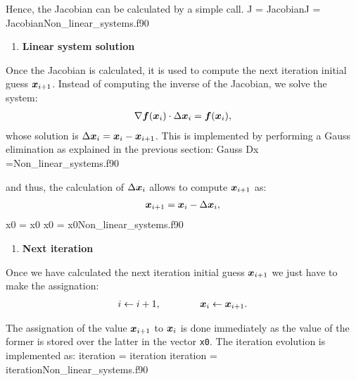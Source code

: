       Hence, the Jacobian can be calculated by a simple call.
      \vspace{0.5cm} 
      {J = Jacobian}{J = Jacobian}{Non_linear_systems.f90}
      
      \begin{enumerate}[resume]
      	\item \textbf{Linear system solution}
      \end{enumerate}
      Once the Jacobian is calculated, it is used to compute the next iteration initial guess $\boldsymbol{x}_{i+1}$. Instead of computing the inverse of the Jacobian, we solve the system:
      \begin{align}
      	\nabla\boldsymbol{f}(\boldsymbol{x}_i)\cdot\Delta \boldsymbol{x}_i
      	=
      	\boldsymbol{f}(\boldsymbol{x}_i) ,
      \end{align}
      whose solution is $\Delta \boldsymbol{x}_i=\boldsymbol{x}_i-\boldsymbol{x}_{i+1}$. 
      This is implemented by performing a Gauss elimination as explained in the previous section:
      \vspace{0.5cm} 
      {Gauss}
      {Dx =}{Non_linear_systems.f90}
      
      
      and thus, the calculation of $\Delta \boldsymbol{x}_i$ allows to compute $\boldsymbol{x}_{i+1}$ as:
      \begin{align*}
      	\boldsymbol{x}_{i+1} = \boldsymbol{x}_{i} - \Delta \boldsymbol{x}_i,
      \end{align*}
      \vspace{0.5cm} 
      {x0 = x0}
      {x0 = x0}{Non_linear_systems.f90}
      
      \begin{enumerate}[resume]
      	\item \textbf{Next iteration}
      \end{enumerate}
      Once we have calculated the next iteration initial guess $\boldsymbol{x}_{i+1}$ we just have to make the assignation:
      \begin{align}
      	i \leftarrow i+1, \qquad \qquad \boldsymbol{x}_{i} \leftarrow \boldsymbol{x}_{i+1}.
      \end{align}
      
      The assignation of the value $\boldsymbol{x}_{i+1}$ to $\boldsymbol{x}_{i}$ is done immediately as the value of the former is stored over the latter in the vector \verb|x0|. The iteration evolution is implemented as:
      \vspace{0.5cm} 
      {iteration = iteration}
      {iteration = iteration}{Non_linear_systems.f90}
      
